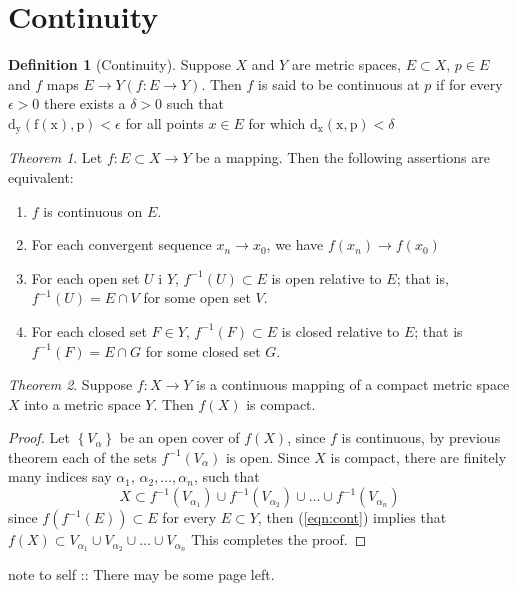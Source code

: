 \documentclass[12pt,oneside,a4paper]{book}
\newcommand{\xn}[2]{{#1}_1{#2}\,{#1}_2{#2}\dots{#2}{#1}_n}
\newcommand{\set}[1]{\left\{#1\right\}}
\theoremstyle{remark}
\newtheorem{thm}{Theorem}[section]
\theoremstyle{definition}
\newtheorem{defn}{Definition}[section]
\begin{document}
\section{Continuity}
\begin{defn}[Continuity]
    Suppose $ X $ and $ Y $ are metric spaces, $ E\subset X,\,p\in E $ and $ f $ maps $ E \to Y (f:E\to Y) $. Then $ f $ is said to be continuous at $ p $ if for every $ \epsilon>0 $ there exists a $ \delta>0 $ such that\\
    \indent $ \mathrm{d_y(f(x), p)}<\epsilon $ for all points $ x \in E $ for which $ \mathrm{d_x(x,p)} <\delta$
\end{defn}
\begin{thm}
    Let $ f:E\subset X\to Y $ be a mapping. Then the following assertions are equivalent:
    \begin{enumerate}[label=(\roman*)]
        \item $ f $ is continuous on $ E $.
        \item For each convergent sequence $ x_n \to x_0 $, we have $ f(x_n) \to f(x_0) $
        \item For each open set $ U $ i $ Y $, $ f^{-1}(U)\subset E $ is open relative to $ E $; that is, $ f^{-1}(U)=E\cap V $ for some open set $ V $.
        \item For each closed set $ F\in Y $, $ f^{-1}(F)\subset E $ is closed relative to $ E $; that is $ f^{-1}(F)=E\cap G $ for some closed set $ G $.
    \end{enumerate}
\end{thm}
\begin{thm}
    Suppose $ f: X\to Y $ is a continuous mapping of a compact metric space $ X $ into a metric space $ Y $. Then $ f(X) $ is compact.
\end{thm}
\begin{proof}
    Let $ \set{V_\alpha} $ be an open cover of $ f(X) $, since $ f $ is continuous, by previous theorem each of the sets $ f^{-1}(V_\alpha) $ is open. Since $ X $ is compact, there are finitely many indices say $ \xn{\alpha}{,} $, such that
    \begin{equation}
        X\subset f^{-1}(V_{\alpha_1})\cup f^{-1}(V_{\alpha_2})\cup \dots\cup f^{-1}(V_{\alpha_n}) \label{eqn:cont}
    \end{equation}
    since $ f(f^{-1}(E))\subset E $ for every $ E\subset Y $, then (\ref{eqn:cont}) implies that $ f(X)\subset V_{\alpha_1}\cup V_{\alpha_2}\cup \dots \cup V_{\alpha_n} $
    This completes the proof.
\end{proof}
note to self :: There may be some page left.
\end{document}
